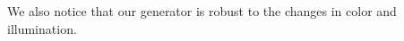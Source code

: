 \documentclass[runningheads]{llncs}
\begin{document}
We also notice that our generator is robust to the changes in color and illumination. 
\end{document}

